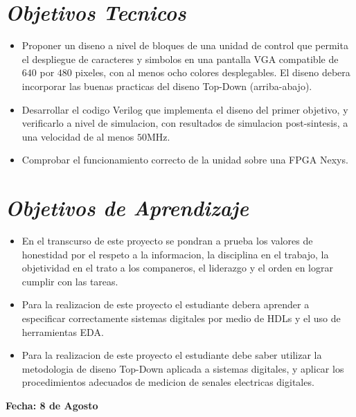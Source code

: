 \documentclass[12pt,a4paper]{report}
\begin{document}
\section*{\textit{Objetivos Tecnicos}}
\begin{itemize}
\item Proponer un diseno a nivel de bloques de una unidad de control que permita el despliegue de caracteres y simbolos en una pantalla VGA compatible de $640$ por $480$ pixeles, con al menos
ocho colores desplegables. El diseno debera incorporar las buenas practicas del diseno Top-Down (arriba-abajo).
\item Desarrollar el codigo Verilog que implementa el diseno del primer objetivo, y verificarlo a nivel de simulacion, con resultados de simulacion post-sintesis, a una velocidad de al menos $50$MHz.
\item Comprobar el funcionamiento correcto de la unidad sobre una FPGA Nexys.
\end{itemize}

\section*{\textit{Objetivos de Aprendizaje}}
\begin{itemize}
\item En el transcurso de este proyecto se pondran a prueba los valores de honestidad por el respeto a la informacion, la disciplina en el trabajo, la objetividad en el trato a los companeros, el liderazgo y el orden en lograr cumplir con las tareas.
\item Para la realizacion de este proyecto el estudiante debera aprender a especificar correctamente sistemas digitales por medio de HDLs y el uso de herramientas EDA.
\item Para la realizacion de este proyecto el estudiante debe saber utilizar la metodologia de diseno Top-Down aplicada a sistemas digitales, y aplicar los procedimientos adecuados de medicion de senales electricas digitales. 
\end{itemize}

\newpage
\begin{flushright}
\begin{large}
\textbf{Fecha: 8 de Agosto}\\
\end{large}
\end{flushright}
\end{document}
